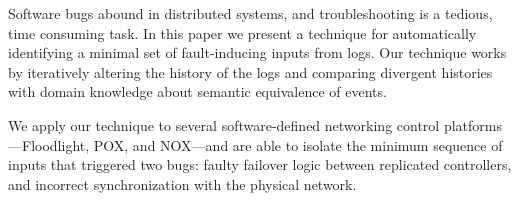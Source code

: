 Software bugs abound in distributed systems, and troubleshooting
is a tedious, time consuming task.
In this paper we present a technique for automatically identifying
a minimal set of fault-inducing inputs from logs. Our technique works by
iteratively altering the history of the logs and comparing divergent histories
with domain knowledge about semantic equivalence of events.

We apply our technique to several software-defined networking control
platforms---Floodlight, POX, and NOX---and
are able to isolate the minimum sequence of inputs that triggered
two bugs: faulty failover logic between replicated controllers, and incorrect
synchronization with the physical network.
